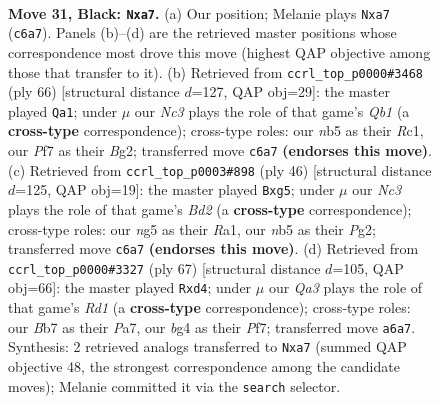 \documentclass[11pt]{article}
\begin{document}
\clearpage

\begin{figure}[p]\centering
\begin{subfigure}{0.46\textwidth}\centering
\resizebox{\linewidth}{!}{%
\newchessgame
\chessboard[
  setfen={4rk2/Pb2rp2/qpn2n2/1N1p2NP/P2P2B1/6R1/2Q2K2/7R b - - 0 31},
  showmover=false,
  pgfstyle=straightmove, color=movearrow, markmove={c6-a7}
]}
\caption{}
\end{subfigure}\hfill
\begin{subfigure}{0.46\textwidth}\centering
\resizebox{\linewidth}{!}{%
\newchessgame
\chessboard[
  setfen={1r4k1/r2n1pp1/b1p4p/3p4/3PPN2/q4PP1/6BP/1QR1R1K1 w - - 5 34},
  showmover=false,
  pgfstyle=straightmove, color=movearrow, markmove={b1-a1}
]}
\caption{}
\end{subfigure}
\\[4pt]
\begin{subfigure}{0.46\textwidth}\centering
\resizebox{\linewidth}{!}{%
\newchessgame
\chessboard[
  setfen={2r1r1k1/4b1p1/2nqp3/1p2p1p1/1P2P3/1Q3N2/3B1PP1/R3R1K1 w - - 0 24},
  showmover=false,
  pgfstyle=straightmove, color=movearrow, markmove={d2-g5}
]}
\caption{}
\end{subfigure}\hfill
\begin{subfigure}{0.46\textwidth}\centering
\resizebox{\linewidth}{!}{%
\newchessgame
\chessboard[
  setfen={3r1rk1/pP3ppp/bq6/N3nNP1/3R4/2Qn4/1P4BP/R6K b - - 2 34},
  showmover=false,
  pgfstyle=straightmove, color=movearrow, markmove={d8-d4}
]}
\caption{}
\end{subfigure}
\caption{\textbf{Move 31, Black: \texttt{Nxa7}.} (a) Our position; Melanie plays \texttt{Nxa7} (\texttt{c6a7}). Panels (b)--(d) are the retrieved master positions whose correspondence most drove this move (highest QAP objective among those that transfer to it). (b) Retrieved from \texttt{ccrl\_top\_p0000\#3468} (ply 66) [structural distance $d$=127, QAP obj=29]: the master played \texttt{Qa1}; under $\mu$ our \emph{Nc3} plays the role of that game's \emph{Qb1} (a \textbf{cross-type} correspondence); cross-type roles: our \emph{n}b5 as their \emph{R}c1, our \emph{P}f7 as their \emph{B}g2; transferred move \texttt{c6a7} \textbf{(endorses this move)}. (c) Retrieved from \texttt{ccrl\_top\_p0003\#898} (ply 46) [structural distance $d$=125, QAP obj=19]: the master played \texttt{Bxg5}; under $\mu$ our \emph{Nc3} plays the role of that game's \emph{Bd2} (a \textbf{cross-type} correspondence); cross-type roles: our \emph{n}g5 as their \emph{R}a1, our \emph{n}b5 as their \emph{P}g2; transferred move \texttt{c6a7} \textbf{(endorses this move)}. (d) Retrieved from \texttt{ccrl\_top\_p0000\#3327} (ply 67) [structural distance $d$=105, QAP obj=66]: the master played \texttt{Rxd4}; under $\mu$ our \emph{Qa3} plays the role of that game's \emph{Rd1} (a \textbf{cross-type} correspondence); cross-type roles: our \emph{B}b7 as their \emph{P}a7, our \emph{b}g4 as their \emph{P}f7; transferred move \texttt{a6a7}. Synthesis: 2 retrieved analogs transferred to \texttt{Nxa7} (summed QAP objective 48, the strongest correspondence among the candidate moves); Melanie committed it via the \texttt{search} selector.}
\label{fig:thought-m61}
\end{figure}
\end{document}
